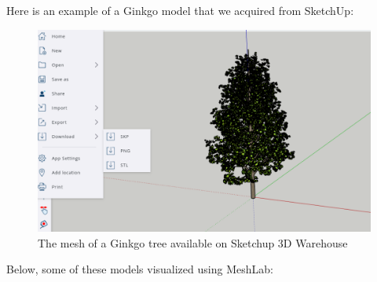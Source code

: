 \documentclass[12pt]{article}
\begin{document}
Here is an example of a Ginkgo model that we acquired from SketchUp:

\begin{figure}[H]
    \centering
        \centering
        \includegraphics[width=\textwidth]{images/ginkgo_sketchup.png}
        \caption{The mesh of a Ginkgo tree available on Sketchup 3D Warehouse}
\end{figure}

\newpage

Below, some of these models visualized using MeshLab\cite{meshlab}:
\end{document}
